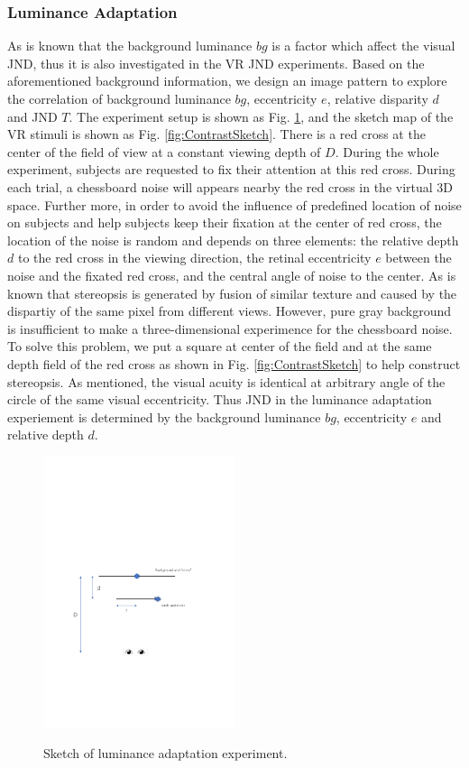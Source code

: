 \documentclass[journal]{IEEEtran}
\begin{document}
\subsubsection{Luminance Adaptation}
As is known that the background luminance $bg$ is a factor which affect the visual JND, thus it is also investigated in the VR JND experiments. Based on the aforementioned background information, we design an image pattern to explore the correlation of background luminance $bg$, eccentricity $e$, relative disparity $d$ and JND $T$. The experiment setup is shown as Fig. \ref{fig:Luminance}, and the sketch map of the VR stimuli is shown as Fig. \ref{fig:ContrastSketch}. There is a red cross at the center of the field of view at a constant viewing depth of $D$. During the whole experiment, subjects are requested to fix their attention at this red cross. During each trial, a chessboard noise will appears nearby the red cross in the virtual 3D space. Further more, in order to avoid the influence of predefined location of noise on subjects and help subjects keep their fixation at the center of red cross, the location of the noise is random and depends on three elements: the relative depth $d$ to the red cross in the viewing direction, the retinal eccentricity $e$ between the noise and the fixated red cross, and the central angle of noise to the center. As is known that stereopsis is generated by fusion of similar texture and caused by the dispartiy of the same pixel from different views. However, pure gray background is insufficient to make a three-dimensional experimence for the chessboard noise. To solve this problem, we put a square at center of the field and at the same depth field of the red cross as shown in Fig. \ref{fig:ContrastSketch} to help construct stereopsis. As mentioned, the visual acuity is identical at arbitrary angle of the circle of the same visual eccentricity. Thus JND in the luminance adaptation experiement is determined by the background luminance $bg$, eccentricity $e$ and relative depth $d$.
\begin{figure}[!t]
	\centering
	\includegraphics[width=0.5\textwidth]{Drawing2}\\
	\caption{Sketch of luminance adaptation experiment.}
	\label{fig:Luminance}
\end{figure}
\end{document}
